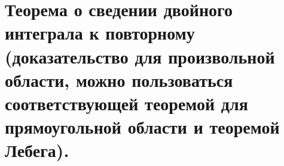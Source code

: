 \section{Теорема о сведении двойного интеграла к повторному (доказательство для произвольной области, можно пользоваться соответствующей теоремой для прямоугольной области и теоремой Лебега).}
